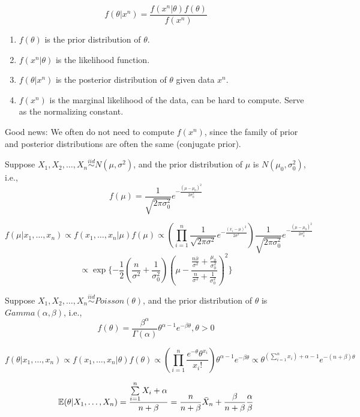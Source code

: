 \[
f(\theta|x^n) = \dfrac{f(x^n|\theta)f(\theta)}{f(x^n)}
\]
\begin{enumerate}
    \item $f(\theta)$ is the prior distribution of $\theta$.
    \item $f(x^n|\theta)$ is the likelihood function.
    \item $f(\theta|x^n)$ is the posterior distribution of $\theta$ given data $x^n$.
    \item $f(x^n)$ is the marginal likelihood of the data, can be hard to compute. Serve as the normalizing constant.
\end{enumerate}

Good news: We often do not need to compute $f(x^n)$, since the family of prior and posterior distributions are often the same (conjugate prior).
\begin{eb}
Suppose $X_1,X_2,\dots,X_n \overset{iid}{\sim} N(\mu,\sigma^2)$, and the prior distribution of $\mu$ is $N(\mu_0,\sigma_0^2)$, i.e.,
\[f(\mu) = \dfrac{1}{\sqrt{2\pi \sigma_0^2}} e^{-\frac{(\mu - \mu_0)^2}{2\sigma_0^2}}\]    
\begin{solution}
    \[
    f(\mu|x_1,\dots,x_n) \propto f(x_1,\dots,x_n|\mu) f(\mu) \propto \left(\prod_{i=1}^n \dfrac{1}{\sqrt{2\pi \sigma^2}} e^{-\frac{(x_i - \mu)^2}{2\sigma^2}}\right) \dfrac{1}{\sqrt{2\pi \sigma_0^2}} e^{-\frac{(\mu - \mu_0)^2}{2\sigma_0^2}}
    \]
    \[\propto \exp\{-\frac{1}{2}\left(\frac{n}{\sigma^2} + \frac{1}{\sigma_0^2}\right) \left(\mu - \frac{\frac{n\bar{x}}{\sigma^2} + \frac{\mu_0}{\sigma_0^2}}{\frac{n}{\sigma^2} + \frac{1}{\sigma_0^2}}\right)^2\} 
    \]
\end{solution}
\end{eb}

\begin{eb}
Suppose $X_1,X_2,\dots,X_n \overset{iid}{\sim} Poisson(\theta)$, and the prior distribution of $\theta$ is $Gamma(\alpha,\beta)$, i.e.,
\[f(\theta) = \dfrac{\beta^\alpha}{\Gamma(\alpha)} \theta^{\alpha - 1} e^{-\beta \theta}, \theta > 0\]

\begin{solution}
    \[
    f(\theta|x_1,\dots,x_n) \propto f(x_1,\dots,x_n|\theta) f(\theta) \propto \left(\prod_{i=1}^n \dfrac{e^{-\theta} \theta^{x_i}}{x_i!}\right) \theta^{\alpha - 1} e^{-\beta \theta} \propto \theta^{(\sum_{i=1}^n x_i )+ \alpha - 1} e^{-(n + \beta) \theta}
    \]

    \[
    \mathbb{E}(\theta| X_1,\dots,X_n) = \dfrac{\sum\limits_{i=1}^{n} X_i + \alpha}{n+\beta} = \dfrac{n}{n+\beta} \bar X_n + \dfrac{\beta}{n + \beta} \dfrac{\alpha}{\beta}
    \]
\end{solution}
\end{eb}

